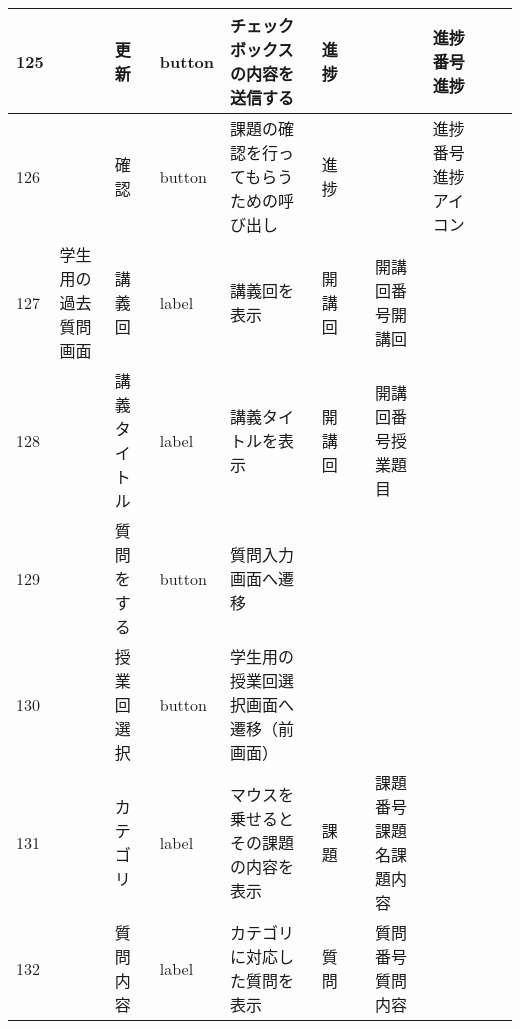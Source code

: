 \begin{landscape}
\begin{table}[]
\begin{tabular}{|l|l|l|l|l|l|l|l|l|l|l|}
125 &               & 更新               & button   & チェックボックスの内容を送信する                                                  & 進捗      &                       &                    & 進捗番号進捗          &                               &                                                                \\ \hline
126 &               & 確認               & button   & 課題の確認を行ってもらうための呼び出し                                               & 進捗      &                       &                    & 進捗番号進捗アイコン      &                               &                                                                \\ \hline
127 & 学生用の過去質問画面    & 講義回              & label    & 講義回を表示                                                            & 開講回     &                       & 開講回番号開講回           &                 &                               &                                                                \\ \hline
128 &               & 講義タイトル           & label    & 講義タイトルを表示                                                         & 開講回     &                       & 開講回番号授業題目          &                 &                               &                                                                \\ \hline
129 &               & 質問をする            & button   & 質問入力画面へ遷移                                                         &         &                       &                    &                 &                               &                                                                \\ \hline
130 &               & 授業回選択            & button   & 学生用の授業回選択画面へ遷移（前画面）                                               &         &                       &                    &                 &                               &                                                                \\ \hline
131 &               & カテゴリ             & label    & マウスを乗せるとその課題の内容を表示                                                & 課題      &                       & 課題番号課題名課題内容        &                 &                               &                                                                \\ \hline
132 &               & 質問内容             & label    & カテゴリに対応した質問を表示                                                    & 質問      &                       & 質問番号質問内容           &                 &                               &                                                                \\ \hline

\end{tabular}
\end{table}
\end{landscape}
